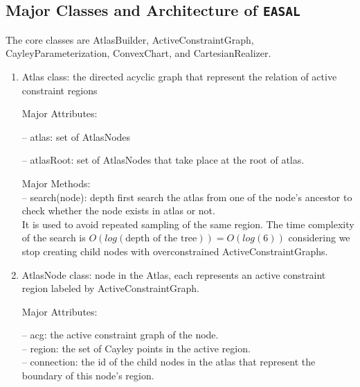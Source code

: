 \subsection{Major Classes and Architecture of \texttt{EASAL}}
\label{sec:classes}

The core classes are AtlasBuilder, ActiveConstraintGraph, CayleyParameterization, ConvexChart, and CartesianRealizer.



\begin{enumerate}

\item \textsf{Atlas} class: the directed acyclic graph that represent the relation of active constraint regions

\smallskip
Major Attributes:

\noindent --  \textsf{atlas}: set of AtlasNodes

\noindent --  \textsf{atlasRoot}: set of AtlasNodes that take place at the root of atlas.

\smallskip
Major Methods:\\
\smallskip
\noindent --  \textsf{search(node)}: depth first search the atlas from one of the node's ancestor to check whether the node exists in atlas or not. \\
It is used to avoid repeated sampling of the same region.
The time complexity of the search is $O(log(\text{depth of the tree})) = O( log(6) )$ considering we stop creating child nodes with overconstrained ActiveConstraintGraphs.\\


\item \textsf{AtlasNode} class: node in the Atlas, each represents an active constraint region labeled by ActiveConstraintGraph.

\smallskip
Major Attributes:

\noindent --  \textsf{acg}: the active constraint graph of the node.\\
\noindent --  \textsf{region}: the set of Cayley points in the active region.\\
\noindent --  \textsf{connection}: the id of the child nodes in the atlas that represent the boundary of this node's region.\\




\end{enumerate}

